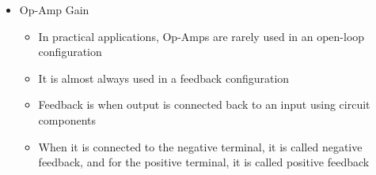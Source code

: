 \begin{itemize}
\begin{itemize}
    \end{itemize}

  \item Op-Amp Gain

    \begin{itemize}
        
      \item In practical applications, Op-Amps are rarely used in an open-loop configuration

      \item It is almost always used in a feedback configuration

      \item Feedback is when output is connected back to an input using circuit components

      \item When it is connected to the negative terminal, it is called negative feedback, and for the positive terminal, it is called positive feedback

    \end{itemize}

\end{itemize}




